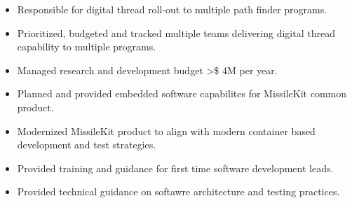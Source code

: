         \begin{itemize}
            \item Responsible for digital thread roll-out to multiple path finder programs.
            \item Prioritized, budgeted and tracked multiple teams delivering digital thread capability to multiple programs.
            \item Managed research and development budget >\$ 4M per year.
        \end{itemize}
        \begin{itemize}
            \item Planned and provided embedded software capabilites for MissileKit common product.
            \item Modernized MissileKit product to align with modern container based development and test strategies.
        \end{itemize}
        \begin{itemize}
            \item Provided training and guidance for first time software development leads.
            \item Provided technical guidance on softawre architecture and testing practices.
        \end{itemize}

